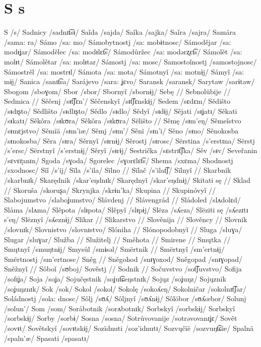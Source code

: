 \chapter{S s}

S /s/
Sadnicy /sadnɪt͡sɨ/
Saǐda /sajda/
Saǐka /sajka/
Saǐra /sajra/
Samára /sama: ra/
Sámo /sa: mo/
Sámobytnostj /sa: mobɨtnosc/
Sámodějar /sa: modᵻʝar/
Sámodělec /sa: modᵻlɛt͡s/
Sámodůržec /sa: modərʐɛt͡s/
Sámolět /sa: molᵻt/
Sámolětar /sa: molᵻtar/
Sámostj /sa: mosc/
Samostoǐnostj /samostojnosc/
Sámostrěl /sa: mostrᵻl/
Sámota /sa: mota/
Sámotnyǐ /sa: motnɨj/
Sámyǐ /sa: mɨj/
Sanica /sanɪt͡sa/
Sarájevo /sara: ʝɛvo/
Saransk /saransk/
Sarytaw /sarɨtaw/
Sbogom /sboɣom/
Sbor /sbor/
Sbornyǐ /sbornɨj/
Sebę //
Sebnolübije //
Sedmica //
Sěčenj /sᵻt͡ʃɛn’/
Sěčenskyǐ /sᵻt͡ʃɛnskɨj/
Sedem /sɛdɛm/
Sědišto /sᵻdɪʂto/
Sědlišto /sᵻdlɪʂto/
Sědlo /sᵻdlo/
Sědyǐ /sᵻdɨj/
Sějati /sᵻʝatɪ/
Sěkati /sᵻkatɪ/
Sěkôra /sᵻkʊra/
Sěkôra /sᵻkʊra/
Sëlišto //
Sěmę /sᵻm’eŋ/
Sěmeǐstvo /sᵻmɛjstvo/
Sěmïä /sᵻm’iæ/
Sěmj /sᵻm’/
Sěnï /sᵻn’i/
Sěno /sᵻno/
Sěnokosba /sᵻnokosba/
Sěra /sᵻra/
Sěrnyǐ /sᵻrnɨj/
Sěrostj /sᵻrosc/
Sërstina /s’erstɪna/ 
Sërstj /s’ersc/
Sërstnyǐ /s’erstnɨj/
Sěryǐ /sᵻrɨj/
Sestrička /sɛstrɪt͡ʃka/
Sěv /sᵻv/
Seveřanin /sɛvɛr̝anɪn/
Sgoda /sɣoda/
Sgorelec /sɣorɛlɛt͡s/
Shema /sxɛma/
Shodnostj /sxodnosc/
Sïǐ /s’ij/
Sïla /s’ila/
Sïlno //
Sïlač /s’ilat͡ʃ/
Sïlnyǐ //
Skarbnik /skarbnɪk/
Skarędnik /skar’eŋdnɪk/
Skarędnyǐ /skar’eŋdnɨj/
Skitati sę //
Sklad //
Skoruša /skoruʂa/
Skrynjka /skrɨn’ka/
Skupina //
Skupinóvyǐ //
Slabojumstvo /slaboʝumstvo/
Slávdenj //
Slávengråd //
Slådoled /slʌdolɛd/
Slåma /slʌma/
Slěpota /slᵻpota/
Slěpyǐ /slᵻpɨj/
Slëza /sʎeza/
Slëziti sę /sʎezɪtɪ s’eŋ/
Slëznyǐ /sʎeznɨj/
Slikar //
Slikarstvo //
Slověnija //
Slověncy //
Slovnik /slovnɪk/
Slovnistvo /slovnɪstvo/
Slóniha //
Slónopodobnyǐ //
Sluga /sluɣa/
Slugar /sluɣar/
Služba //
Služitelj //
Směhota //
Smirene //
Smųtka //
Smųtnyǐ /smuŋtnɨj/
Smysůl /smɨsəl/
Smërtnik //
Smërtnyǐ /sm’ertnɨj/
Smërtnostj /sm’ertnosc/
Sněg //
Sněgohod /snᵻɣoxod/
Sněgopad /snᵻɣopad/
Sněžnyǐ //
Sôboǐ /sʊboj/
Sověstj //
Sodnik //
Sočuvstvo /sot͡ʃuvstvo/
Sofija /sofɪʝa/
Soja /soʝa/
Sojučęstnik /soʝut͡ɕeŋstnɪk/
Sojųz /soʝuŋz/
Sojųznik /soʝuŋznɪk/
Sok /sok/
Sokol /sokol/
Sokolę /sokoʎeŋ/
Sokolničar /sokolnɪt͡ʃar/
Soládnostj /sola: dnosc/
Sôlj /sʊʎ/
Sôljnyǐ /sʊʎnɨj/
Sôlöbor /sʊʎœbor/
Solunj /solun’/
Som /som/
Soråbotnik /sorʌbotnɪk/
Sorbskyǐ /sorbskɨj/
Sorbskyǐ /sorbskɨj/
Sorby /sorbɨ/
Sosna /sosna/
Sotrůvovanije /sotrəvovanɪʝɛ/
Sovět /sovᵻt/
Sovětskyǐ /sovᵻtskɨj/
Sozïdnuti /soz’idnutɪ/
Sozvųčïë /sozvuŋt͡ɕie/
Spalnä /spaln’æ/
Spasati /spasatɪ/
